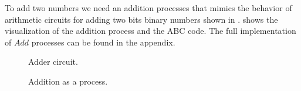 To add two numbers we need an addition processes that mimics the behavior of arithmetic circuits for adding two bits binary numbers shown in 
.
 shows the visualization of the addition process and the ABC code.
The full implementation of $Add$ processes can be found in the appendix.
\begin{figure}[H]%
\centering
{}
\caption{Adder circuit.}
\label{tra_adder_circuit}%
\end{figure}


\begin{figure}[H]%
\centering
\hspace{\fill}
%
\hspace{1em}%
%
\vspace{2em}
%
\caption{Addition as a process.}
\label{tra_addition}%
\end{figure}
